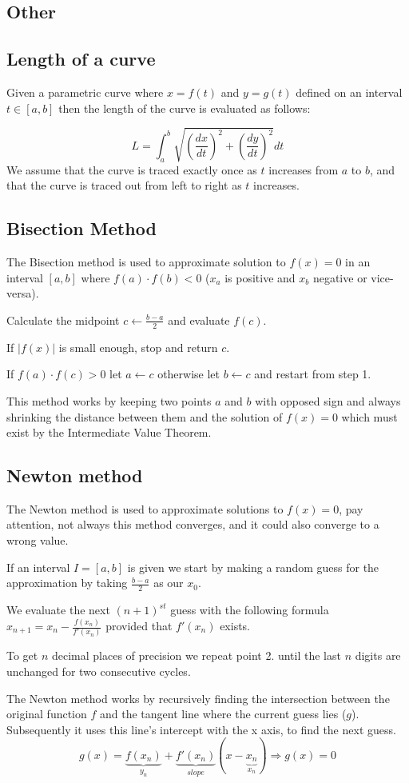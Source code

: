 \documentclass[8pt,a4paper]{extarticle}     %
\theoremstyle{definition}
\theoremstyle{definition}
\theoremstyle{definition}
\begin{document}
\begin{multicols}{4}
\section{Other}
\subsection{Length of a curve}
Given a parametric curve where $x=f(t)$ and $y=g(t)$ defined on an interval $t\in[a,b]$ then the length of the curve is evaluated as follows: 

$$L = \int_a^b\sqrt{\left(\frac{dx}{dt}\right)^2 + \left(\frac{dy}{dt}\right)^2}dt$$
We assume that the curve is traced exactly once as $t$ increases from $a$ to $b$, and that the curve is traced out from left to right as $t$ increases.
\subsection{Bisection Method}
The Bisection method is used to approximate solution to $f(x)=0$ in an interval $[a,b]$ where $f(a)\cdot f(b)<0$ ($x_a$ is positive and $x_b$ negative or vice-versa).
\begin{numberlist}
	\item Calculate the midpoint $c\leftarrow\frac{b-a}{2}$ and evaluate $f(c)$.
	\item If $|f(x)|$ is small enough, stop and return $c$.
	\item If $f(a)\cdot f(c)>0$ let $a\leftarrow c$ otherwise let $b\leftarrow c$ and restart from step 1. 
\end{numberlist}
This method works by keeping two points $a$ and $b$ with opposed sign and always shrinking the distance between them and the solution of $f(x) = 0$ which must exist by the Intermediate Value Theorem.

\subsection{Newton method}
The Newton method is used to approximate solutions to $f(x)=0$, pay attention, not always this method converges, and it could also converge to a wrong value.   
\begin{numberlist}
	\item If an interval $I=[a,b]$ is given we start by making a random guess for the approximation by taking $\frac{b-a}{2}$ as our $x_0$.
	\item We evaluate the next $(n+1)^{st}$ guess with the following formula $x_{n+1} = x_n - \frac{f(x_n)}{f'(x_n)}$ provided that $f'(x_n)$ exists. 
	\item To get $n$ decimal places of precision we repeat point 2. until the last $n$ digits are unchanged for two consecutive cycles. 
\end{numberlist}
The Newton method works by recursively finding the intersection between the original function $f$ and the tangent line where the current guess lies ($g$). Subsequently it uses this line's intercept with the x axis, to find the next guess. 
$$g(x) = \underbrace{f(x_n)}_{y_n} + \underbrace{f'(x_n)}_{\textit{slope}}(x-\underbrace{x_n}_{x_n}) \Rightarrow g(x) = 0$$


\end{multicols}
\end{document}
